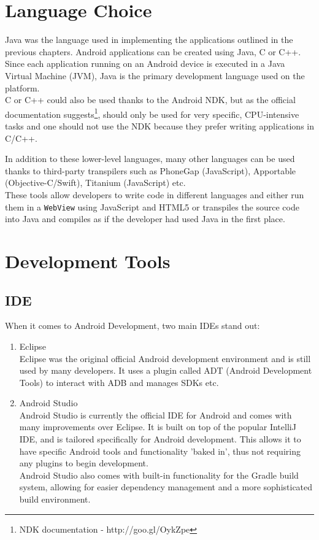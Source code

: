
\section{Language Choice}
Java was the language used in implementing the applications outlined in the
previous chapters. Android applications can be created using Java, C or C++.
Since each application running on an Android device is executed in a Java
Virtual Machine (JVM), Java is the primary development language used on the
platform.\\
C or C++ could also be used thanks to the Android NDK, but as the official
documentation suggests\footnote{NDK documentation - http://goo.gl/OykZpe},
should only be used for very specific, CPU-intensive tasks and one should not
use the NDK because they prefer writing applications in C/C++.

In addition to these lower-level languages, many other languages can be used
thanks to third-party transpilers such as PhoneGap (JavaScript), Apportable
(Objective-C/Swift), Titanium (JavaScript) etc.\\
These tools allow developers to write code in different languages and either
run them in a \texttt{WebView} using JavaScript and HTML5 or transpiles the
source code into Java and compiles as if the developer had used Java in the
first place.

\section{Development Tools}

\subsection{IDE}
When it comes to Android Development, two main IDEs stand out:
\begin{enumerate}
\item Eclipse\\
    Eclipse was the original official Android development environment and is
    still used by many developers. It uses a plugin called ADT
    (Android Development Tools) to interact with ADB and manages SDKs etc.
\item Android Studio\\
    Android Studio is currently the official IDE for Android and comes with
    many improvements over Eclipse. It is built on top of the popular IntelliJ
    IDE, and is tailored specifically for Android development. This allows it
    to have specific Android tools and functionality 'baked in', thus not
    requiring any plugins to begin development.\\
    Android Studio also comes with built-in functionality for the Gradle build
    system, allowing for easier dependency management and a more sophisticated
    build environment.
\end{enumerate}

